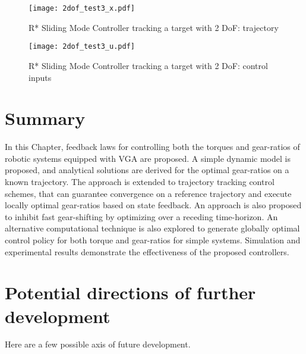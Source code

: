 %
\begin{figure}[htp]
	\centering
		\texttt{[image: 2dof\_test3\_x.pdf]}
	\caption{R* Sliding Mode Controller tracking a target with 2 DoF: trajectory}
	\label{fig:exp_traj_2dof_x}
\end{figure}
%

%
\begin{figure}[htp]
	\centering
		\texttt{[image: 2dof\_test3\_u.pdf]}
	\caption{R* Sliding Mode Controller tracking a target with 2 DoF: control inputs}
	\label{fig:exp_traj_2dof_u}
\end{figure}
%





\newpage

\section{Summary}

In this Chapter, feedback laws for controlling both the torques and gear-ratios of robotic systems equipped with VGA are proposed. A simple dynamic model is proposed, and analytical solutions are derived for the optimal gear-ratios on a known trajectory. The approach is extended to trajectory tracking control schemes, that can guarantee convergence on a reference trajectory and execute locally optimal gear-ratios based on state feedback. An approach is also proposed to inhibit fast gear-shifting by optimizing over a receding time-horizon. An alternative computational technique is also explored to generate globally optimal control policy for both torque and gear-ratios for simple systems. Simulation and experimental results demonstrate the effectiveness of the proposed controllers.

\section{Potential directions of further development}

Here are a few possible axis of future development. 

